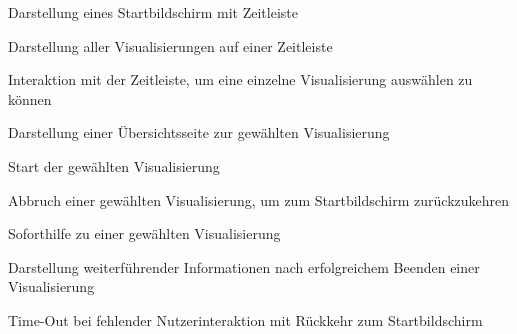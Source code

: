 \documentclass{article}
\begin{document}
\begin{FA}[start=100]
  \item Darstellung eines Startbildschirm mit Zeitleiste
  \item Darstellung aller Visualisierungen auf einer Zeitleiste
  \item Interaktion mit der Zeitleiste, um eine einzelne Visualisierung auswählen zu können
  \item Darstellung einer Übersichtsseite zur gewählten Visualisierung
  \item Start der gewählten Visualisierung
  \item Abbruch einer gewählten Visualisierung, um zum Startbildschirm zurückzukehren
  \item Soforthilfe zu einer gewählten Visualisierung
  \item Darstellung weiterführender Informationen nach erfolgreichem Beenden einer Visualisierung 
  \item Time-Out bei fehlender Nutzerinteraktion mit Rückkehr zum Startbildschirm
\end{FA}
\end{document}
